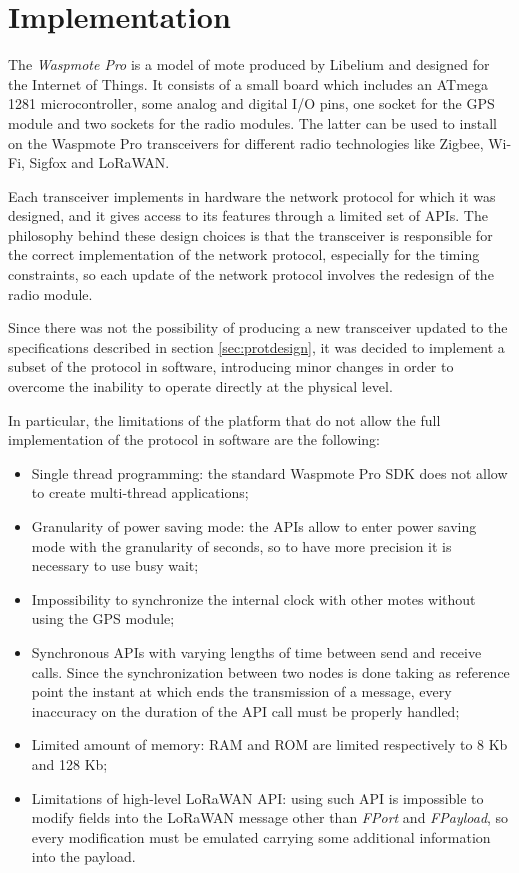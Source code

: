 \section{Implementation}

The \emph{Waspmote Pro} is a model of mote produced by Libelium and designed for the Internet of Things. It consists of a small board which includes an ATmega 1281 microcontroller, some analog and digital I/O pins, one socket for the GPS module and two sockets for the radio modules. The latter can be used to install on the Waspmote Pro transceivers for different radio technologies like Zigbee, Wi-Fi, Sigfox and LoRaWAN.

Each transceiver implements in hardware the network protocol for which it was designed, and it gives access to its features through a limited set of APIs. The philosophy behind these design choices is that the transceiver is responsible for the correct implementation of the network protocol, especially for the timing constraints, so each update of the network protocol involves the redesign of the radio module.

Since there was not the possibility of producing a new transceiver updated to the specifications described in section \ref{sec:protdesign}, it was decided to implement a subset of the protocol in software, introducing minor changes in order to overcome the inability to operate directly at the physical level.

In particular, the limitations of the platform that do not allow the full implementation of the protocol in software are the following:

\begin{itemize}
\item Single thread programming: the standard Waspmote Pro SDK does not allow to create multi-thread applications;

\item Granularity of power saving mode: the APIs allow to enter power saving mode with the granularity of seconds, so to have more precision it is necessary to use busy wait;

\item Impossibility to synchronize the internal clock with other motes without using the GPS module;

\item Synchronous APIs with varying lengths of time between send and receive calls. Since the synchronization between two nodes is done taking as reference point the instant at which ends the transmission of a message, every inaccuracy on the duration of the API call must be properly handled; 

\item Limited amount of memory: RAM and ROM are limited respectively to 8 Kb and 128 Kb;

\item Limitations of high-level LoRaWAN API: using such API is impossible to modify fields into the LoRaWAN message other than \emph{FPort} and \emph{FPayload}, so every modification must be emulated carrying some additional information into the payload.
\end{itemize}


